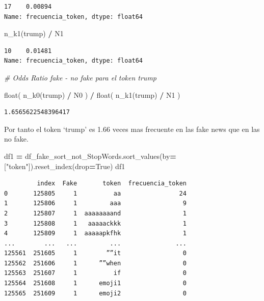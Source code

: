 \documentclass[
  11pt,
  a4paper,
]{article}
\newenvironment{Shaded}{\begin{snugshade}}{\end{snugshade}}
\newcommand{\BuiltInTok}[1]{#1}
\newcommand{\CommentTok}[1]{\textcolor[rgb]{0.56,0.35,0.01}{\textit{#1}}}
\newcommand{\NormalTok}[1]{#1}
\newcommand{\OperatorTok}[1]{\textcolor[rgb]{0.81,0.36,0.00}{\textbf{#1}}}
\newcommand{\StringTok}[1]{\textcolor[rgb]{0.31,0.60,0.02}{#1}}
\newcommand{\VariableTok}[1]{\textcolor[rgb]{0.00,0.00,0.00}{#1}}
\begin{document}
\begin{verbatim}
17    0.00894
Name: frecuencia_token, dtype: float64
\end{verbatim}

\begin{Shaded}
\begin{Highlighting}[]
\NormalTok{n\_k1(}\StringTok{\textquotesingle{}trump\textquotesingle{}}\NormalTok{) }\OperatorTok{/}\NormalTok{ N1}
\end{Highlighting}
\end{Shaded}

\begin{verbatim}
10    0.01481
Name: frecuencia_token, dtype: float64
\end{verbatim}

\begin{Shaded}
\begin{Highlighting}[]
\CommentTok{\# Odds Ratio fake {-} no fake para el token \textquotesingle{}trump\textquotesingle{}}

\BuiltInTok{float}\NormalTok{( n\_k0(}\StringTok{\textquotesingle{}trump\textquotesingle{}}\NormalTok{) }\OperatorTok{/}\NormalTok{ N0 ) }\OperatorTok{/} \BuiltInTok{float}\NormalTok{( n\_k1(}\StringTok{\textquotesingle{}trump\textquotesingle{}}\NormalTok{) }\OperatorTok{/}\NormalTok{ N1 )}
\end{Highlighting}
\end{Shaded}

\begin{verbatim}
1.6565622548396417
\end{verbatim}

Por tanto el token `trump' es 1.66 veces mas frecuente en las fake news
que en las no fake.

\begin{Shaded}
\begin{Highlighting}[]
\NormalTok{df1 }\OperatorTok{=}\NormalTok{ df\_fake\_sort\_not\_StopWords.sort\_values(by}\OperatorTok{=}\NormalTok{[}\StringTok{"token"}\NormalTok{]).reset\_index(drop}\OperatorTok{=}\VariableTok{True}\NormalTok{)}
\NormalTok{df1}
\end{Highlighting}
\end{Shaded}

\begin{verbatim}
         index  Fake       token  frecuencia_token
0       125805     1          aa                24
1       125806     1         aaa                 9
2       125807     1  aaaaaaaand                 1
3       125808     1   aaaaackkk                 1
4       125809     1  aaaaapkfhk                 1
...        ...   ...         ...               ...
125561  251605     1        ””it                 0
125562  251606     1      ””when                 0
125563  251607     1          if                 0
125564  251608     1      emoji1                 0
125565  251609     1      emoji2                 0
\end{verbatim}
\end{document}
